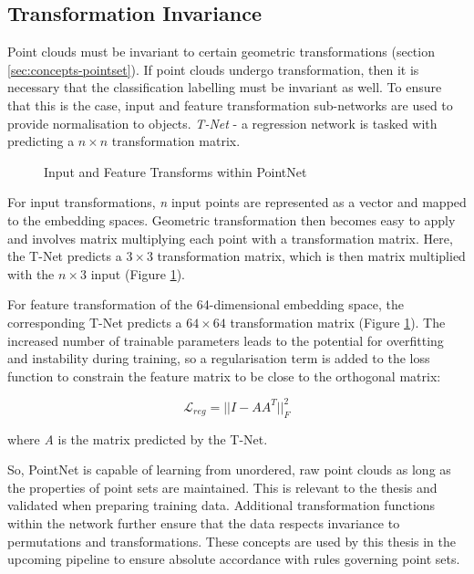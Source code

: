 \subsection{Transformation Invariance}
Point clouds must be invariant to certain geometric transformations (section \ref{sec:concepts-pointset}). If point clouds undergo transformation, then it is necessary that the classification labelling must be invariant as well. To ensure that this is the case, input and feature transformation sub-networks are used to provide normalisation to objects. \textit{T-Net} - a regression network is tasked with predicting a $n{\times}n$ transformation matrix.  

\begin{figure}[ht]   
\centering
{}
\caption[]{Input and Feature Transforms within PointNet}
\label{fig:input_feature_transform}
\end{figure}

For input transformations, \textit{n} input points are represented as a vector and  mapped to the embedding spaces. Geometric transformation then becomes easy to apply and involves matrix multiplying each point with a transformation matrix. Here, the T-Net predicts a $3{\times}3$ transformation matrix, which is then matrix multiplied with the $n{\times}3$ input (Figure \ref{fig:input_feature_transform}).

For feature transformation of the 64-dimensional embedding space, the corresponding T-Net predicts a $64{\times}64$ transformation matrix (Figure \ref{fig:input_feature_transform}). The increased number of trainable parameters leads to the potential for overfitting and instability during training, so a regularisation term is added to the loss function to constrain the feature matrix to be close to the orthogonal matrix:

\begin{equation}
    \mathcal{L}_{reg} = || I - AA^{T} ||^{2}_{F}
\end{equation}

where \textit{A} is the matrix predicted by the T-Net. 

So, PointNet is capable of learning from unordered, raw point clouds as long as the properties of point sets are maintained. This is relevant to the thesis and validated when preparing training data. Additional transformation functions within the network further ensure that the data respects invariance to permutations and transformations. These concepts are used by this thesis in the upcoming pipeline to ensure absolute accordance with rules governing point sets. 
